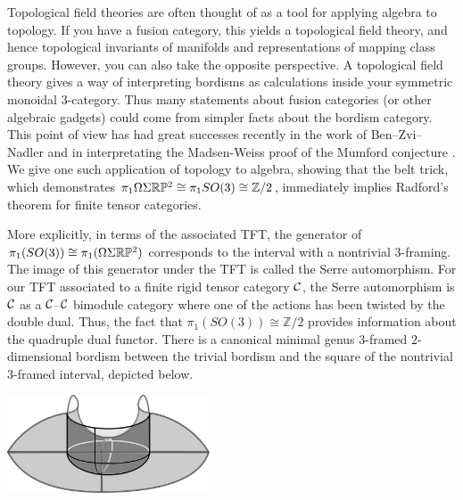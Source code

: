 \documentclass{amsart}
\begin{document}



Topological field theories are often thought of as a tool for applying algebra to topology.  If you have a fusion category, this yields a topological field theory, and hence topological invariants of manifolds and representations of mapping class groups.  However, you can also take the opposite perspective.  A topological field theory gives a way of interpreting bordisms as calculations inside your symmetric monoidal $3$-category.  Thus many statements about fusion categories (or other algebraic gadgets) could come from simpler facts about the bordism category.  This point of view has had great successes recently in the work of Ben--Zvi--Nadler \cite{0904.1247} and in interpretating the Madsen-Weiss proof of the Mumford conjecture \cite{MR2335797, MR2555928}.  We give one such application of topology to algebra, showing that the belt trick, which demonstrates $\pi_1 \Omega \Sigma \mathbb R \mathbb P^2 \cong \pi_1 SO(3) \cong \mathbb{Z}/2$, immediately implies Radford's theorem for finite tensor categories.







More explicitly, in terms of the associated TFT, the generator of $\pi_1(SO(3)) \cong \pi_1(\Omega \Sigma \mathbb R \mathbb P^2)$ corresponds to the interval with a nontrivial $3$-framing.  The image of this generator under the TFT is called the Serre automorphism.  For our TFT associated to a finite rigid tensor category $\mathcal C$, the Serre automorphism is $\mathcal C$ as a $\mathcal C$--$\mathcal C$ bimodule category where one of the actions has been twisted by the double dual.  Thus, the fact that $\pi_1(SO(3)) \cong \mathbb{Z}/2$ provides information about the quadruple dual functor.  There is a canonical minimal genus $3$-framed $2$-dimensional bordism between the trivial bordism and the square of the nontrivial $3$-framed interval, depicted below.

\begin{center}
\includegraphics[width=60mm]{cobordism.png}
\end{center}
\end{document}
